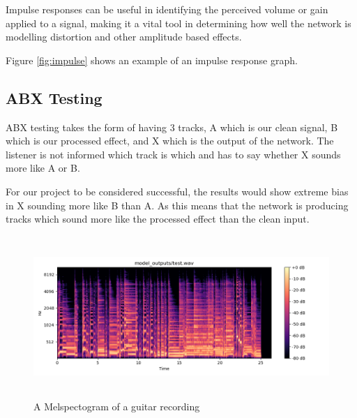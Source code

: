 \documentclass{l4proj}
\begin{document}
Impulse responses can be useful in identifying the perceived volume or
gain applied to a signal, making it a vital tool in determining how well
the network is modelling distortion and other amplitude based effects.

Figure \ref{fig:impulse} shows an example of an impulse response graph.

\subsection{ABX Testing}\label{abx-testing}

ABX testing takes the form of having 3 tracks, A which is our clean
signal, B which is our processed effect, and X which is the output of
the network. The listener is not informed which track is which and has
to say whether X sounds more like A or B.

For our project to be considered successful, the results would show
extreme bias in X sounding more like B than A. As this means that the
network is producing tracks which sound more like the processed effect
than the clean input.

\begin{figure}
\centering
\includegraphics[width=6.00000in,height=2.40000in]{images/spect.png}
\caption{A Melspectogram of a guitar recording\label{fig:spectogram}}
\end{figure}
\end{document}
